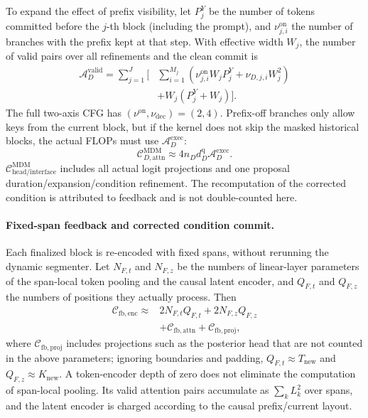 To expand the effect of prefix visibility, let $P_j^Y$ be the number of tokens committed before the $j$-th block (including the prompt), and $\nu_{j,i}^{\mathrm{on}}$ the number of branches with the prefix kept at that step. With effective width $W_j$, the number of valid pairs over all refinements and the clean commit is
\begin{equation}
\begin{aligned}
    \mathcal A_D^{\mathrm{valid}}
    =\sum_{j=1}^{J}\Bigg[&
       \sum_{i=1}^{M_j}\left(
         \nu_{j,i}^{\mathrm{on}}W_jP_j^Y
         +\nu_{D,j,i}W_j^2\right)\\
       &+W_j(P_j^Y+W_j)\Bigg].
\end{aligned}
\label{eq:app-cost-mdm-attention-pairs}
\end{equation}
The full two-axis CFG has $(\nu^{\mathrm{on}},\nu_{\mathrm{dec}})=(2,4)$. Prefix-off branches only allow keys from the current block, but if the kernel does not skip the masked historical blocks, the actual FLOPs must use $\mathcal A_D^{\mathrm{exec}}$:
\begin{equation}
    \mathcal C_{D,\mathrm{attn}}^{\mathrm{MDM}}
    \approx4n_Dd_D^{\mathrm q}\mathcal A_D^{\mathrm{exec}}.
    \label{eq:app-cost-mdm-attention}
\end{equation}
$\mathcal C_{\mathrm{head/interface}}^{\mathrm{MDM}}$ includes all actual logit projections and one proposal duration/expansion/condition refinement. The recomputation of the corrected condition is attributed to feedback and is not double-counted here.

\paragraph{Fixed-span feedback and corrected condition commit.}
Each finalized block is re-encoded with fixed spans, without rerunning the dynamic segmenter. Let $N_{F,t}$ and $N_{F,z}$ be the numbers of linear-layer parameters of the span-local token pooling and the causal latent encoder, and $Q_{F,t}$ and $Q_{F,z}$ the numbers of positions they actually process. Then
\begin{equation}
\begin{aligned}
    \mathcal C_{\mathrm{fb,enc}}
    \approx{}&2N_{F,t}Q_{F,t}+2N_{F,z}Q_{F,z}\\
       &+\mathcal C_{\mathrm{fb,attn}}
        +\mathcal C_{\mathrm{fb,proj}},
\end{aligned}
\label{eq:app-cost-feedback-encoder}
\end{equation}
where $\mathcal C_{\mathrm{fb,proj}}$ includes projections such as the posterior head that are not counted in the above parameters; ignoring boundaries and padding, $Q_{F,t}\approx T_{\mathrm{new}}$ and $Q_{F,z}\approx K_{\mathrm{new}}$. A token-encoder depth of zero does not eliminate the computation of span-local pooling. Its valid attention pairs accumulate as $\sum_k L_k^2$ over spans, and the latent encoder is charged according to the causal prefix/current layout.

